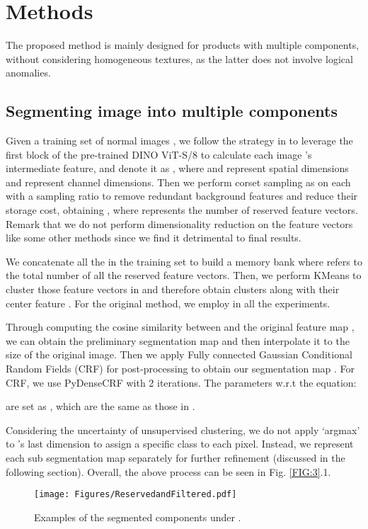 \documentclass[final,5p,times,twocolumn]{elsarticle}
\begin{document}
\section{Methods}
\label{3}
The proposed method is mainly designed for products with multiple components, without considering homogeneous textures, as the latter does not involve logical anomalies.
\subsection{Segmenting image into multiple components}
\label{3.1}
Given a training set of normal images , we follow the strategy in \cite{hamilton2022unsupervised} to leverage the first block of the pre-trained DINO ViT-S/8 to calculate each image 's intermediate feature, and denote it as , where  and  represent spatial dimensions and  represent channel dimensions. Then we perform corset sampling as \cite{roth2022towards} on each  with a sampling ratio  to remove redundant background features and reduce their storage cost, obtaining , where  represents the number of reserved feature vectors. Remark that we do not perform dimensionality reduction on the feature vectors like some other methods \cite{roth2022towards, hamilton2022unsupervised} since we find it detrimental to final results. 

We concatenate all the  in the training set  to build a memory bank  where  refers to the total number of all the reserved feature vectors. Then, we perform KMeans to cluster those feature vectors in  and therefore obtain  clusters along with their center feature . For the original method, we employ  in all the experiments.  


Through computing the cosine similarity between  and the original feature map , we can obtain the preliminary segmentation map and then interpolate it to the size of the original image. Then we apply Fully connected Gaussian Conditional Random Fields (CRF) \cite{lafferty2001conditional} for post-processing to obtain our segmentation map . For CRF, we use PyDenseCRF with 2 iterations. The parameters w.r.t the equation:

are set as , which are the same as those in \cite{hamilton2022unsupervised}. 

Considering the uncertainty of unsupervised clustering, we do not apply `argmax' to 's last dimension to assign a specific class to each pixel. Instead, we represent each sub segmentation map  separately for further refinement (discussed in the following section). Overall, the above process can be seen in Fig. \ref{FIG:3}.1. 
\begin{figure}
\centering
		\texttt{[image: Figures/ReservedandFiltered.pdf]}\caption{Examples of the segmented components under . }
	\label{FIG:4}
\end{figure}
\end{document}
